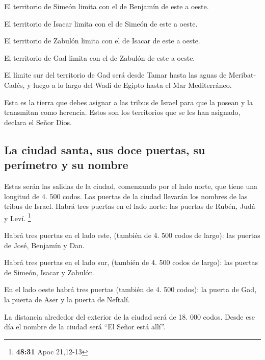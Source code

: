  El territorio de Simeón limita con el de Benjamín de
este a oeste.

 El territorio de Isacar limita con el de Simeón de este
a oeste.

 El territorio de Zabulón limita con el de Isacar de este
a oeste.

 El territorio de Gad limita con el de Zabulón de este a
oeste.

 El límite sur del territorio de Gad será desde Tamar
hasta las aguas de Meribat-Cadés, y luego a lo largo del Wadi de Egipto
hasta el Mar Mediterráneo.

 Esta es la tierra que debes asignar a las tribus de
Israel para que la posean y la transmitan como herencia. Estos son los
territorios que se les han asignado, declara el Señor Dios.

\hypertarget{la-ciudad-santa-sus-doce-puertas-su-peruxedmetro-y-su-nombre}{%
\subsection{La ciudad santa, sus doce puertas, su perímetro y su
nombre}\label{la-ciudad-santa-sus-doce-puertas-su-peruxedmetro-y-su-nombre}}

 Estas serán las salidas de la ciudad, comenzando por el
lado norte, que tiene una longitud de 4. 500 codos.  Las
puertas de la ciudad llevarán los nombres de las tribus de Israel. Habrá
tres puertas en el lado norte: las puertas de Rubén, Judá y Leví.
\footnote{\textbf{48:31} Apoc 21,12-13}

 Habrá tres puertas en el lado este, (también de 4. 500
codos de largo): las puertas de José, Benjamín y Dan.

 Habrá tres puertas en el lado sur, (también de 4. 500
codos de largo): las puertas de Simeón, Isacar y Zabulón.

 En el lado oeste habrá tres puertas (también de 4. 500
codos): la puerta de Gad, la puerta de Aser y la puerta de Neftalí.

 La distancia alrededor del exterior de la ciudad será de
18. 000 codos. Desde ese día el nombre de la ciudad será ``El Señor está
allí''.
